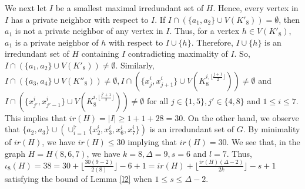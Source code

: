 \documentclass[11pt]{article}
\newcommand{\2}{ \vspace{0.2cm} }
\newcommand{\1}{ \vspace{0.1cm} }
\begin{document}
\indent We next let $I$ be a smallest maximal irredundant set of $H$. Hence, every vertex in $I$ has a private neighbor with respect to $I$. If $I \cap (\{a_{1}, a_{2}\} \cup V(K'_{8})) = \emptyset$, then $a_{1}$ is not a private neighbor of any vertex in $I$. Thus, for a vertex $h \in V(K'_{8})$, $a_{1}$ is a private neighbor of $h$ with respect to $I \cup \{h\}$. Therefore, $I \cup \{h\}$ is an irredundant set of $H$ containing $I$ contradicting maximality of $I$. So, $I \cap (\{a_{1}, a_{2}\} \cup V(K'_{8})) \neq \emptyset$. Similarly, $I \cap (\{a_{3}, a_{4}\} \cup V(K''_{8})) \neq \emptyset, I \cap (\{x^{i}_{j}, x^{i}_{j + 1}\} \cup V(K^{i, \lfloor\frac{j + 1}{2}\rfloor}_{8})) \neq \emptyset$ and $I \cap (\{x^{i}_{j'}, x^{i}_{j' - 1}\} \cup V(K^{i, \lfloor\frac{j' + 1}{2}\rfloor}_{8})) \neq \emptyset$ for all $j \in \{1, 5\}, j' \in \{4, 8\}$ and $1 \leq i \leq 7$. This implies that $ir(H) = |I| \geq 1 + 1 + 28 = 30$. On the other hand, we observe that $\{a_{2}, a_{3}\} \cup (\cup^{7}_{i = 1}\{x^{i}_{2}, x^{i}_{3}, x^{i}_{6}, x^{i}_{7}\})$ is an irredundant set of $G$. By minimality of $ir(H)$, we have $ir(H) \leq 30$ implying that $ir(H) = 30$. We see that, in the graph $H = H(8, 6, 7)$, we have $k = 8, \Delta = 9, s = 6$ and $l = 7$. Thus, $\iota_{8}(H) = 38 = 30 + \lfloor\frac{30(9 - 2)}{2(8)}\rfloor - 6 + 1 = ir(H) + \lfloor\frac{ir(H)(\Delta - 2)}{2k}\rfloor - s + 1$ satisfying the bound of Lemma \ref{l2} when $1 \leq s \leq \Delta - 2$.
\end{document}
